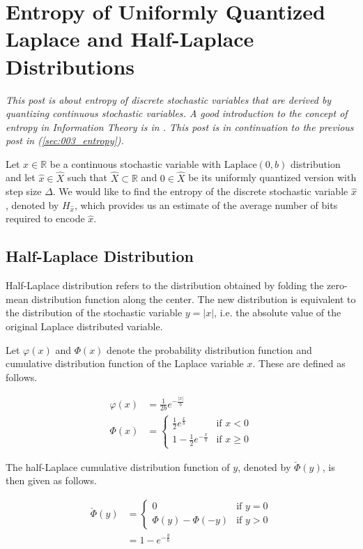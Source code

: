 \section{Entropy of Uniformly Quantized Laplace and Half-Laplace Distributions}

\emph{This post is about entropy of discrete stochastic variables that are derived by quantizing continuous stochastic variables. A good introduction to the concept of entropy in Information Theory is in \cite{Cover2012}. This post is in continuation to the previous post in (\ref{sec:003_entropy}).}

Let $x \in \mathbb{R}$ be a continuous stochastic variable with $\text{Laplace}(0, b)$ distribution and let $\hat{x} \in \hat{X}$ such that $\hat{X} \subset \mathbb{R}$ and $0 \in \hat{X}$ be its uniformly quantized version with step size $\Delta$. We would like to find the entropy of the discrete stochastic variable $\hat{x}$, denoted by $H_{\hat{x}}$, which provides us an estimate of the average number of bits required to encode $\hat{x}$.

\subsection{Half-Laplace Distribution}

Half-Laplace distribution refers to the distribution obtained by folding the zero-mean distribution function along the center. The new distribution is equivalent to the distribution of the stochastic variable $y = |x|$, i.e. the absolute value of the original Laplace distributed variable.

Let $\varphi(x)$ and $\Phi(x)$ denote the probability distribution function and cumulative distribution function of the Laplace variable $x$. These are defined as follows.

\begin{align}\varphi(x) &= \frac{1}{2b} e^{-\frac{|x|}{b}} \\ \Phi(x) &= \begin{cases} \frac{1}{2} e^{\frac{x}{b}} & \text{if $x < 0$} \\ 1 - \frac{1}{2} e^{-\frac{x}{b}} & \text{if $x \geq 0$}\end{cases}\end{align}

The half-Laplace cumulative distribution function of $y$, denoted by $\breve{\Phi}(y)$, is then given as follows.

\begin{align} \breve{\Phi}(y) &= \begin{cases} 0 & \text{if $y = 0$} \\ \Phi(y) - \Phi(-y) & \text{if $y > 0$}\end{cases} \\ &= 1 - e^{-\frac{y}{b}} \label{eqn:le} \end{align}

